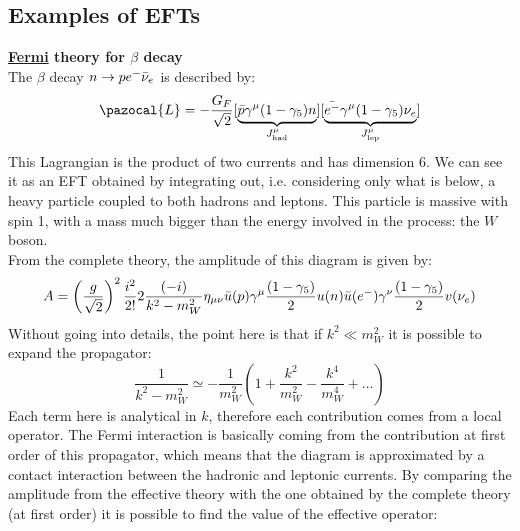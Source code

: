 \documentclass[../main.tex]{subfiles}
\begin{document}
\subsection{Examples of EFTs}
\begin{example}\textbf{\href{https://en.wikipedia.org/wiki/Enrico_Fermi}{Fermi} theory for $\beta$ decay}\\
The $\beta$ decay $n\to pe^-\Bar{\nu}_e$ is described by:
\[
\pazocal{L}=-\frac{G_F}{\sqrt{2}}[\underbrace{\Bar{p}\gamma^\mu(1-\gamma_5)n}_{J^{\mu}_{\text{had}}}][\underbrace{\Bar{e^-}\gamma^\mu(1-\gamma_5)\nu_e}_{J^{\mu}_{\text{lep}}}]
\]
This Lagrangian is the product of two currents and has dimension 6. We can see it as an EFT obtained by integrating out, i.e. considering only what is below, a heavy particle coupled to both hadrons and leptons. This particle is massive with spin 1, with a mass much bigger than the energy involved in the process: the $W$ boson.\\
From the complete theory, the amplitude of this diagram is given by:
\[
A=\left(\frac{g}{\sqrt{2}}\right)^2\frac{i^2}{2!}2\frac{(-i)}{k^2-m_W^2}\eta_{\mu\nu}\Bar{u}(p)\gamma^\mu\frac{(1-\gamma_5)}{2}u(n)\Bar{u}(e^-)\gamma^\nu\frac{(1-\gamma_5)}{2}v(\nu_e)
\]
Without going into details, the point here is that if $k^2\ll m_W^2$ it is possible to expand the propagator:
\[
\frac{1}{k^2-m_W^2}\simeq-\frac{1}{m_W^2}\left(1+\frac{k^2}{m_W^2}-\frac{k^4}{m_W^4}+\dots\right)
\]
Each term here is analytical in $k$, therefore each contribution comes from a local operator. The Fermi interaction is basically coming from the contribution at first order of this propagator, which means that the diagram is approximated by a contact interaction between the hadronic and leptonic currents. By comparing the amplitude from the effective theory with the one obtained by the complete theory (at first order) it is possible to find the value of the effective operator:

\end{example}
\end{document}
